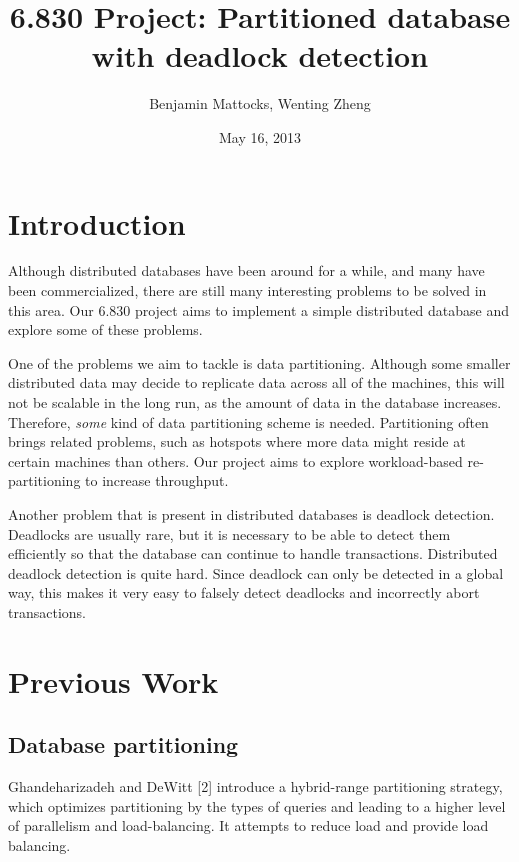 \documentclass[a4paper, 10pt, notitlepage]{article}
\title{6.830 Project: Partitioned database with deadlock detection}
\author{Benjamin Mattocks, Wenting Zheng}
\date{May 16, 2013} %
\begin{document}
\maketitle
\thispagestyle{empty}
\newpage


\section{Introduction}

Although distributed databases have been around for a while, and many have been commercialized, there are still many
interesting problems to be solved in this area. Our 6.830 project aims to implement a simple distributed database
and explore some of these problems.

One of the problems we aim to tackle is data partitioning. Although some smaller distributed data may decide to replicate
data across all of the machines, this will not be scalable in the long run, as the amount of data in the database
increases. Therefore, {\em some} kind of data partitioning scheme is needed. Partitioning often brings related problems, such
as hotspots where more data might reside at certain machines than others. Our project aims to explore workload-based re-partitioning to increase throughput.

Another problem that is present in distributed databases is deadlock detection. Deadlocks are usually rare, but it is necessary
to be able to detect them efficiently so that the database can continue to handle transactions. Distributed deadlock detection
is quite hard. Since deadlock can only be detected in a global way, this makes it very easy to falsely detect deadlocks and
incorrectly abort transactions.


\section{Previous Work}

\subsection{Database partitioning}
Ghandeharizadeh and DeWitt [2] introduce a hybrid-range partitioning strategy, which optimizes partitioning by the types of queries and leading to a higher level of parallelism and load-balancing. It attempts to reduce load and provide load balancing.
\end{document}
